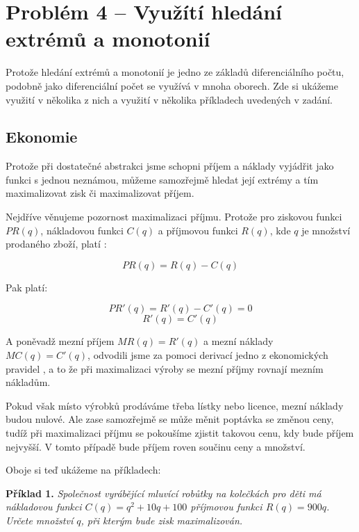 \documentclass{fkssolpub}
\author{Ondřej Sedláček}
\begin{document}
 

\section{Problém 4 -- Využítí hledání extrémů a monotonií}

Protože hledání extrémů a monotonií je jedno ze základů diferenciálního
počtu, podobně jako diferenciální počet se využívá v mnoha oborech.
Zde si ukážeme využití v několika z nich a využití v několika příkladech
uvedených v zadání.

\subsection{Ekonomie}

Protože při dostatečné abstrakci jsme schopni příjem a náklady vyjádřit
jako funkci s jednou neznámou, můžeme samozřejmě hledat její extrémy a 
tím maximalizovat zisk či maximalizovat příjem.

Nejdříve věnujeme pozornost maximalizaci příjmu. Protože pro ziskovou
funkci $PR(q)$, nákladovou funkci $C(q)$ a příjmovou funkci $R(q)$,
kde $q$ je množství prodaného zboží, platí \cite{zahradnickova_ekonomicke_2009}
\cite{mazurek_matematika_2013}:

\[
  PR(q) = R(q) - C(q)
\]

Pak platí:

\[
  PR'(q) = R'(q) - C'(q) = 0
\]
\[
  R'(q) = C'(q)
\]

A poněvadž mezní příjem $MR(q) = R'(q)$ a mezní náklady $MC(q) = C'(q)$,
odvodili jsme za pomoci derivací jedno z ekonomických pravidel 
\cite{noauthor_slovnicek_nodate} \cite{mazurek_matematika_2013}, 
a to že při maximalizaci výroby se mezní příjmy rovnají mezním nákladům. 

Pokud však místo výrobků prodáváme třeba lístky nebo licence, mezní
náklady budou nulové. Ale zase samozřejmě se může měnit poptávka se
změnou ceny, tudíž při maximalizaci příjmu se pokoušíme zjistit takovou
cenu, kdy bude příjem nejvyšší. V tomto případě bude příjem roven
součinu ceny a množství. \cite{zahradnickova_ekonomicke_2009} 
\cite{mazurek_matematika_2013}

Oboje si teď ukážeme na příkladech:

\textbf{Příklad 1.} 
\textit{Společnost vyrábějící mluvící robůtky na kolečkách pro děti 
má nákladovou funkci $C(q) = q^2 + 10q + 100$ příjmovou funkci
$R(q) = 900q$. Určete množství $q$, při kterým bude zisk maximalizován.}
\end{document}
